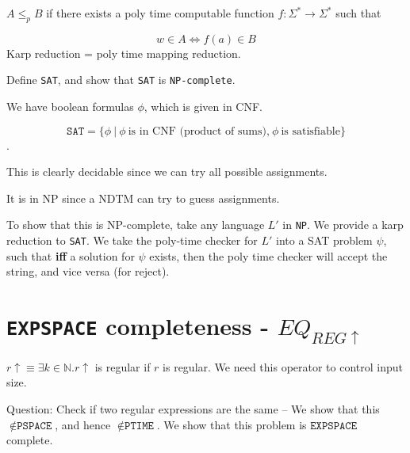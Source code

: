 $A \leq_p B$ if there exists a poly time computable function $f: \Sigma^* \to
\Sigma^*$ such that 

$$w \in A \Leftrightarrow f(a) \in B$$
Karp reduction = poly time mapping reduction.

Define \texttt{SAT}, and show that \texttt{SAT} is \texttt{NP-complete}.


We have boolean formulas $\phi$, which is given in CNF.

$$\texttt{SAT} = \{ \phi~\vert~\phi~\text{is in CNF (product of sums),}~\phi~\text{is satisfiable} \}$$.

This is clearly decidable since we can try all possible assignments.

It is in NP since a NDTM can try to guess assignments.

To show that this is NP-complete, take any language $L'$ in \texttt{NP}. We provide
a karp reduction to \texttt{SAT}. We take the poly-time checker for $L'$ into a
SAT problem $\psi$, such that \textbf{iff} a solution for $\psi$ exists, then the poly
time checker will accept the string, and vice versa (for reject).



\section{\texttt{EXPSPACE} completeness - $EQ_{REG\uparrow}$}
$r \uparrow \equiv \exists k \in \mathbb{N}. r \uparrow$ is regular if $r$ is
regular.  We need this operator to control input size.

Question: Check if two regular expressions are the same -- We show that
this $\notin \texttt{PSPACE}$, and hence $\notin \texttt{PTIME}$. We show that
this problem is $\texttt{EXPSPACE}$ complete.


